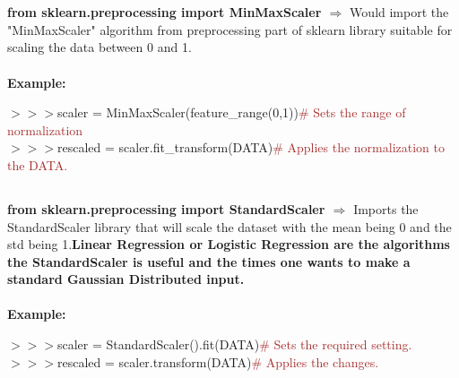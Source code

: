 \documentclass[a4paper,18pt]{article}
\begin{document}
\newpage

\section{\colorbox {Abi}{}}
\subsection{\colorbox {matgreen}{\color{white}{\large from sklearn.preprocessing import MinMaxScaler}}}
\textbf{from sklearn.preprocessing import MinMaxScaler $\Rightarrow$} Would import the "MinMaxScaler" algorithm from preprocessing part of sklearn library suitable for scaling the data between 0 and 1.\\\\
\textbf{Example:\\}

$>>>$scaler = MinMaxScaler(feature\_range(0,1)){\textcolor{brown}{\# Sets the range of normalization}}\\

$>>>$rescaled = scaler.fit\_transform(DATA){\textcolor{brown}{\# Applies the normalization to the DATA.}}\\


\subsection{\colorbox {matgreen}{\color{white}{\large from sklearn.preprocessing import StandardScaler}}}
\textbf{from sklearn.preprocessing import StandardScaler $\Rightarrow$} Imports the StandardScaler library that will scale the dataset with the mean being 0 and the std being 1.{\textbf{\textcolor{important}{Linear Regression or Logistic Regression are the algorithms the StandardScaler is useful and the times one wants to make a standard Gaussian Distributed input.}}}\\\\
\textbf{Example:\\}

$>>>$scaler = StandardScaler().fit(DATA){\textcolor{brown}{\# Sets the required setting.}}\\

$>>>$rescaled = scaler.transform(DATA){\textcolor{brown}{\# Applies the changes.}}\\
\end{document}
